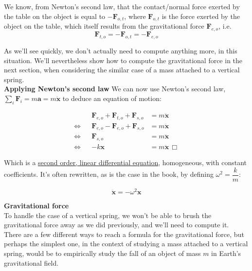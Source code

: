 \documentclass[solutions.tex]{subfiles}
\renewcommand{\bm}[1]{\pmb{#1}}
\renewcommand{\qed}{\,\Box}
\begin{document}
We know, from Newton's second law, that the contact/normal
force exerted by the table on the object is equal to $-\bm{F}_{o,t}$,
where $\bm{F}_{o,t}$ is the force exerted by the object on the table,
which itself results from the gravitational force $\bm{F}_{e,o}$, i.e.
\[
	\bm{F}_{t,o} = -\bm{F}_{o,t} = -\bm{F}_{e,o}
\]

As we'll see quickly, we don't actually need to compute anything
more, in this situation. We'll nevertheless show how to compute the
gravitational force in the next section, when considering the
similar case of a mass attached to a vertical spring. \\

\textbf{Applying Newton's second law}  We can now use Newton's second
law, $\sum_i \bm{F}_i = m\bm{a} = m\ddot{\bm{x}}$ to deduce an
equation of motion:

\begin{equation*} \begin{aligned}
	~ && \bm{F}_{e,o} + \bm{F}_{t,o} + \bm{F}_{s,o} &= m\ddot{\bm{x}} \\
	\Leftrightarrow && \bm{F}_{e,o} - \bm{F}_{e,o} + \bm{F}_{s,o} &= m\ddot{\bm{x}} \\
	\Leftrightarrow && \bm{F}_{s,o} &= m\ddot{\bm{x}} \\
	\Leftrightarrow && -k\bm{x} &= m\ddot{\bm{x}} \qed
\end{aligned} \end{equation*}

Which is a \href{https://en.wikipedia.org/wiki/Linear\_differential\_equation\#Second\-order\_case}
{second order, linear differential equation}, homogeneous, with constant
coefficients. It's often rewritten, as is the case in the book,
by defining $\omega^2 = \dfrac{k}{m}$:

\[ \boxed{\ddot{\bm{x}} = -\omega^2\bm{x}} \]

\hr
\textbf{Gravitational force} \\
To handle the case of a vertical spring, we won't be able to brush
the gravitational force away as we did previously, and we'll need to
compute it. \\

There are a few different ways to reach a formula for the
gravitational force, but perhaps the simplest one, in the context of
studying a mass attached to a vertical spring, would be to empirically
study the fall of an object of mass $m$ in Earth's gravitational
field. \\
\end{document}
